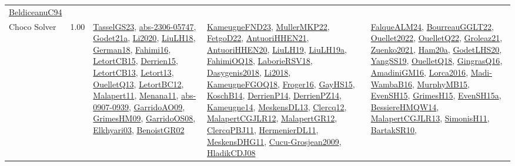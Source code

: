 {\begin{longtable}{p{3cm}r>{\raggedright\arraybackslash}p{6cm}>{\raggedright\arraybackslash}p{6cm}>{\raggedright\arraybackslash}p{8cm}}
\hyperref[detail:BeldiceanuC94]{BeldiceanuC94}\\
\index{Choco Solver}\index{CPSystems!Choco Solver}Choco Solver &  1.00 & \hyperref[detail:TasselGS23]{TasselGS23}, \hyperref[detail:abs-2306-05747]{abs-2306-05747}, \hyperref[detail:Godet21a]{Godet21a}, \hyperref[detail:Li2020]{Li2020}, \hyperref[detail:LiuLH18]{LiuLH18}, \hyperref[detail:German18]{German18}, \hyperref[detail:Fahimi16]{Fahimi16}, \hyperref[detail:LetortCB15]{LetortCB15}, \hyperref[detail:Derrien15]{Derrien15}, \hyperref[detail:LetortCB13]{LetortCB13}, \hyperref[detail:Letort13]{Letort13}, \hyperref[detail:OuelletQ13]{OuelletQ13}, \hyperref[detail:LetortBC12]{LetortBC12}, \hyperref[detail:Malapert11]{Malapert11}, \hyperref[detail:Menana11]{Menana11}, \hyperref[detail:abs-0907-0939]{abs-0907-0939}, \hyperref[detail:GarridoAO09]{GarridoAO09}, \hyperref[detail:GrimesHM09]{GrimesHM09}, \hyperref[detail:GarridoOS08]{GarridoOS08}, \hyperref[detail:Elkhyari03]{Elkhyari03}, \hyperref[detail:BenoistGR02]{BenoistGR02} & \hyperref[detail:KameugneFND23]{KameugneFND23}, \hyperref[detail:MullerMKP22]{MullerMKP22}, \hyperref[detail:FetgoD22]{FetgoD22}, \hyperref[detail:AntuoriHHEN21]{AntuoriHHEN21}, \hyperref[detail:AntuoriHHEN20]{AntuoriHHEN20}, \hyperref[detail:LiuLH19]{LiuLH19}, \hyperref[detail:LiuLH19a]{LiuLH19a}, \hyperref[detail:FahimiOQ18]{FahimiOQ18}, \hyperref[detail:LaborieRSV18]{LaborieRSV18}, \hyperref[detail:Dasygenis2018]{Dasygenis2018}, \hyperref[detail:Li2018]{Li2018}, \hyperref[detail:KameugneFGOQ18]{KameugneFGOQ18}, \hyperref[detail:Froger16]{Froger16}, \hyperref[detail:GayHS15]{GayHS15}, \hyperref[detail:KoschB14]{KoschB14}, \hyperref[detail:DerrienP14]{DerrienP14}, \hyperref[detail:DerrienPZ14]{DerrienPZ14}, \hyperref[detail:Kameugne14]{Kameugne14}, \hyperref[detail:MeskensDL13]{MeskensDL13}, \hyperref[detail:Clercq12]{Clercq12}, \hyperref[detail:MalapertCGJLR12]{MalapertCGJLR12}, \hyperref[detail:MalapertGR12]{MalapertGR12}, \hyperref[detail:ClercqPBJ11]{ClercqPBJ11}, \hyperref[detail:HermenierDL11]{HermenierDL11}, \hyperref[detail:MeskensDHG11]{MeskensDHG11}, \hyperref[detail:Cucu-Grosjean2009]{Cucu-Grosjean2009}, \hyperref[detail:HladikCDJ08]{HladikCDJ08} & \hyperref[detail:FalqueALM24]{FalqueALM24}, \hyperref[detail:BourreauGGLT22]{BourreauGGLT22}, \hyperref[detail:Ouellet2022]{Ouellet2022}, \hyperref[detail:OuelletQ22]{OuelletQ22}, \hyperref[detail:Groleaz21]{Groleaz21}, \hyperref[detail:Zuenko2021]{Zuenko2021}, \hyperref[detail:Ham20a]{Ham20a}, \hyperref[detail:GodetLHS20]{GodetLHS20}, \hyperref[detail:YangSS19]{YangSS19}, \hyperref[detail:OuelletQ18]{OuelletQ18}, \hyperref[detail:GingrasQ16]{GingrasQ16}, \hyperref[detail:AmadiniGM16]{AmadiniGM16}, \hyperref[detail:Lorca2016]{Lorca2016}, \hyperref[detail:Madi-WambaB16]{Madi-WambaB16}, \hyperref[detail:MurphyMB15]{MurphyMB15}, \hyperref[detail:EvenSH15]{EvenSH15}, \hyperref[detail:GrimesH15]{GrimesH15}, \hyperref[detail:EvenSH15a]{EvenSH15a}, \hyperref[detail:BessiereHMQW14]{BessiereHMQW14}, \hyperref[detail:MalapertCGJLR13]{MalapertCGJLR13}, \hyperref[detail:SimonisH11]{SimonisH11}, \hyperref[detail:BartakSR10]{BartakSR10}, 
\end{longtable}}
